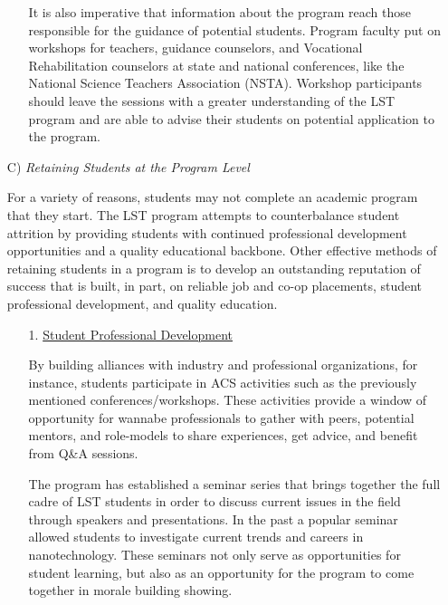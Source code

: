 \documentclass[11.5pt]{sig-alternate} %
\begin{document}
\begin{large}
\begin{itemize}
\begin{enumerate}
\begin{sloppypar}
        It is also imperative that information about the program reach those responsible for the guidance of potential students. Program faculty put on workshops for teachers, guidance counselors, and Vocational Rehabilitation counselors at state and national conferences, like the National Science Teachers Association (NSTA). Workshop participants should leave the sessions with a greater understanding of the LST program and are able to advise their students on potential application to the program.\end{sloppypar}
    \end{enumerate}
    \item[C)] \textit{Retaining Students at the Program Level}
    \begin{sloppypar}For a variety of reasons, students may not complete an academic program that they start. The LST program attempts to counterbalance student attrition by providing students with continued professional development opportunities and a quality educational backbone. Other effective methods of retaining students in a program is to develop an outstanding reputation of success that is built, in part, on reliable job and co-op placements, student professional development, and quality education.\end{sloppypar}
    \begin{enumerate}
        \item[1.] \underline{Student Professional Development}
        \begin{sloppypar}By building alliances with industry and professional organizations, for instance, students participate in ACS activities such as the previously mentioned conferences/workshops. These activities provide a window of opportunity for wannabe professionals to gather with peers, potential mentors, and role-models to share experiences, get advice, and benefit from Q\&A sessions.

        The program has established a seminar series that brings together the full cadre of LST students in order to discuss current issues in the field through speakers and presentations. In the past a popular seminar allowed students to investigate current trends and careers in nanotechnology. These seminars not only serve as opportunities for student learning, but also as an opportunity for the program to come together in morale building showing.


\end{sloppypar}
\end{enumerate}
\end{itemize}
\end{large}
\end{document}
